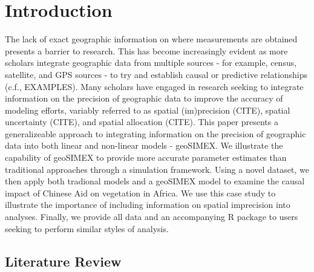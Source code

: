 \section{Introduction}
The lack of exact geographic information on where measurements are obtained presents a barrier to research.
This has become increasingly evident as more scholars integrate geographic data from multiple sources - for example, census, satellite, and GPS sources - to try and establish causal or predictive relationships (c.f., EXAMPLES).
Many scholars have engaged in research seeking to integrate information on the precision of geographic data to improve the accuracy of modeling efforts, variably referred to as spatial (im)precision (CITE), spatial uncertainty (CITE), and spatial allocation (CITE).
This paper presents a generalizeable approach to integrating information on the precision of geographic data into both linear and non-linear models - geoSIMEX.
We illustrate the capability of geoSIMEX to provide more accurate parameter estimates than traditional approaches through a simulation framework. 
Using a novel dataset, we then apply both tradional models and a geoSIMEX model to examine the causal impact of Chinese Aid on vegetation in Africa.
We use this case study to illustrate the importance of including information on spatial imprecision into analyses.
Finally, we provide all data and an accompanying R package to users seeking to perform similar styles of analysis.

\subsection{Literature Review}

